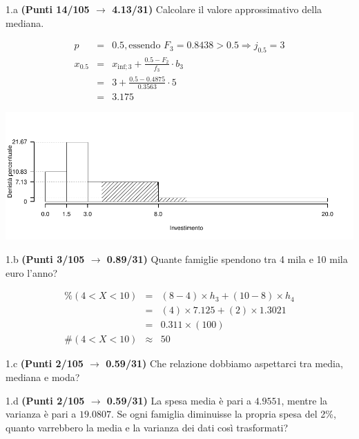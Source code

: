 \documentclass[
  11pt,
]{book}
\theoremstyle{mytheoremstyle}
\theoremstyle{mydefstyle}
\newenvironment{sol}
  {
  \begin{tcolorbox}[enhanced,breakable,arc=0.1mm,boxrule=1pt,colback=white,colframe=iblue,
  title=\bf \fontfamily{lmss}\selectfont \hspace{.5 cm} Soluzione,drop fuzzy shadow]

}{
\end{tcolorbox}
  }
\begin{document}
1.a \textbf{(Punti 14/105 \(\rightarrow\) 4.13/31)} Calcolare il valore approssimativo della mediana.

\begin{sol}

\begin{eqnarray*}
  p &=&  0.5 , \text{essendo }F_{ 3 }= 0.8438  > 0.5  \Rightarrow j_{ 0.5 }= 3 \\
  x_{ 0.5 } &=& x_{\text{inf}; 3 } + \frac{ { 0.5 } - F_{ 2 }} {f_{ 3 }} \cdot b_{ 3 } \\
            &=&  3  + \frac {{ 0.5 } -  0.4875 } { 0.3563 } \cdot  5  \\
            &=&  3.175 
\end{eqnarray*}

\begin{center}\includegraphics{Esami_passati_con_soluzioni_files/figure-latex/2024-63-1} \end{center}

\end{sol}

1.b \textbf{(Punti 3/105 \(\rightarrow\) 0.89/31)} Quante famiglie spendono tra 4 mila e 10 mila euro l'anno?

\begin{sol}
\begin{eqnarray*} \%(4<X<10) &=& (8-4)\times h_{3}+  (10-8)\times h_{4}  \\ 
 &=& (4)\times 7.125+  (2)\times 1.3021  \\ 
 &=&  0.311 \times(100)\\
     \#( 4 < X < 10 ) &\approx& 50 
         \end{eqnarray*}

\end{sol}

1.c \textbf{(Punti 2/105 \(\rightarrow\) 0.59/31)} Che relazione dobbiamo aspettarci tra media, mediana e moda?

1.d \textbf{(Punti 2/105 \(\rightarrow\) 0.59/31)} La spesa media è pari a \(4.9551\), mentre la varianza è pari a \(19.0807\).
Se ogni famiglia diminuisse la propria spesa del 2\%, quanto varrebbero la media e la varianza dei dati così trasformati?
\end{document}
